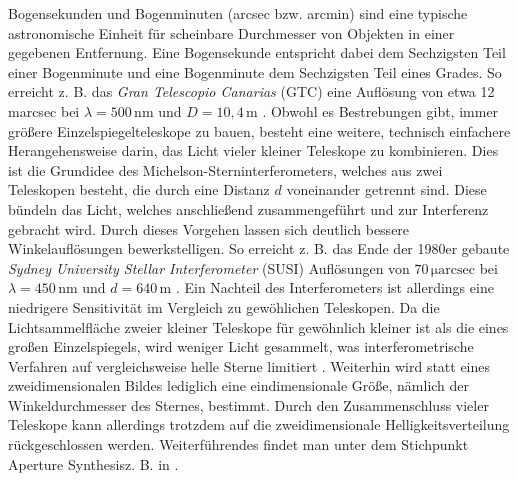 Bogensekunden und Bogenminuten (arcsec bzw. arcmin) sind eine typische astronomische Einheit für scheinbare Durchmesser von Objekten in einer gegebenen Entfernung. 
Eine Bogensekunde entspricht dabei dem Sechzigsten Teil einer Bogenminute und eine Bogenminute dem Sechzigsten Teil eines Grades. 
So erreicht z. B. das \emph{Gran Telescopio Canarias} (GTC) eine Auflösung von etwa 12\,marcsec bei $\lambda=500\,\mathrm{nm}$ und $D=10{,}4\,\mathrm{m}$ \cite{GranTelescopioCANARIAS}. 
Obwohl es Bestrebungen gibt, immer größere Einzelspiegelteleskope zu bauen, besteht eine weitere, technisch einfachere Herangehensweise darin, das Licht vieler kleiner Teleskope zu kombinieren. 
Dies ist die Grundidee des Michelson-Sterninterferometers, welches aus zwei Teleskopen besteht, die durch eine Distanz $d$ voneinander getrennt sind. 
Diese bündeln das Licht, welches anschließend zusammengeführt und zur Interferenz gebracht wird. 
Durch dieses Vorgehen lassen sich deutlich bessere Winkelauflösungen bewerkstelligen. 
So erreicht z. B. das Ende der 1980er gebaute \emph{Sydney University Stellar Interferometer} (SUSI) Auflösungen von $70\,\mathrm{\mu arcsec}$ bei $\lambda=450\,\mathrm{nm}$ und $d=640\,\mathrm{m}$ \cite{davisSydneyUniversityStellar1999}. 
Ein Nachteil des Interferometers ist allerdings eine niedrigere Sensitivität im Vergleich zu gewöhlichen Teleskopen. 
Da die Lichtsammelfläche zweier kleiner Teleskope für gewöhnlich kleiner ist als die eines großen Einzelspiegels, wird weniger Licht gesammelt, was interferometrische Verfahren auf vergleichsweise helle Sterne limitiert \cite[Kap. 6.1]{foxQuantumOpticsIntroduction2006}. 
Weiterhin wird statt eines zweidimensionalen Bildes lediglich eine eindimensionale Größe, nämlich der Winkeldurchmesser des Sternes, bestimmt. 
Durch den Zusammenschluss vieler Teleskope kann allerdings trotzdem auf die zweidimensionale Helligkeitsverteilung rückgeschlossen werden. 
Weiterführendes findet man unter dem Stichpunkt \glqq Aperture Synthesis\grqq\;z. B. in \cite[Kap. 10]{burkeIntroductionRadioAstronomy2019}. \\

